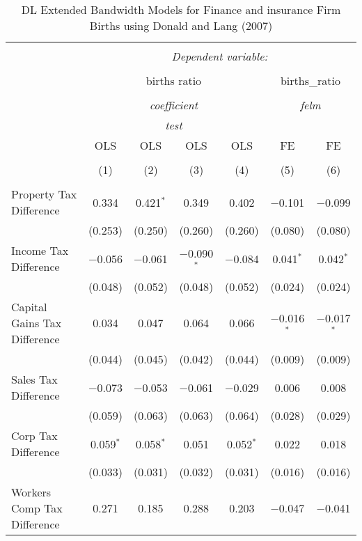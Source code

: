 
\begin{table}[!htbp] \centering 
  \caption{DL Extended Bandwidth Models for  Finance and insurance Firm Births using Donald and Lang (2007)} 
  \label{} 
\begin{tabular}{@{\extracolsep{5pt}}lcccccc} 
\\[-1.8ex]\hline 
\hline \\[-1.8ex] 
 & \multicolumn{6}{c}{\textit{Dependent variable:}} \\ 
\cline{2-7} 
\\[-1.8ex] & \multicolumn{4}{c}{births ratio} & \multicolumn{2}{c}{births\_ratio} \\ 
\\[-1.8ex] & \multicolumn{4}{c}{\textit{coefficient}} & \multicolumn{2}{c}{\textit{felm}} \\ 
 & \multicolumn{4}{c}{\textit{test}} & \multicolumn{2}{c}{\textit{}} \\ 
 & OLS & OLS & OLS & OLS & FE & FE \\ 
\\[-1.8ex] & (1) & (2) & (3) & (4) & (5) & (6)\\ 
\hline \\[-1.8ex] 
 Property Tax Difference & 0.334 & 0.421$^{*}$ & 0.349 & 0.402 & $-$0.101 & $-$0.099 \\ 
  & (0.253) & (0.250) & (0.260) & (0.260) & (0.080) & (0.080) \\ 
  Income Tax Difference & $-$0.056 & $-$0.061 & $-$0.090$^{*}$ & $-$0.084 & 0.041$^{*}$ & 0.042$^{*}$ \\ 
  & (0.048) & (0.052) & (0.048) & (0.052) & (0.024) & (0.024) \\ 
  Capital Gains Tax Difference & 0.034 & 0.047 & 0.064 & 0.066 & $-$0.016$^{*}$ & $-$0.017$^{*}$ \\ 
  & (0.044) & (0.045) & (0.042) & (0.044) & (0.009) & (0.009) \\ 
  Sales Tax Difference & $-$0.073 & $-$0.053 & $-$0.061 & $-$0.029 & 0.006 & 0.008 \\ 
  & (0.059) & (0.063) & (0.063) & (0.064) & (0.028) & (0.029) \\ 
  Corp Tax Difference & 0.059$^{*}$ & 0.058$^{*}$ & 0.051 & 0.052$^{*}$ & 0.022 & 0.018 \\ 
  & (0.033) & (0.031) & (0.032) & (0.031) & (0.016) & (0.016) \\ 
  Workers Comp Tax Difference & 0.271 & 0.185 & 0.288 & 0.203 & $-$0.047 & $-$0.041 \\ 

\end{tabular}
\end{table}

